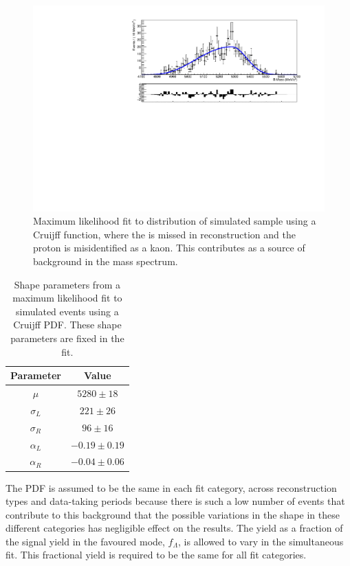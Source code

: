 \begin{figure}[h]
\centering
\includegraphics[width=0.7\linewidth]{figures/backgrounds/Lb2LcKst.pdf}
\caption{Maximum likelihood fit to distribution of simulated  sample using a Cruijff function, where the \pip is missed in reconstruction and the proton is misidentified as a kaon. This contributes as a source of background in the \kk mass spectrum.}
\label{Lbfit}
\end{figure}

\begin{table}[h]
\centering
\begin{tabular}{cc}
\hline
Parameter & Value \\
\hline
$\mu$ & $5280 \pm 18$ \\
$\sigma_L$ & $221 \pm 26$ \\
$\sigma_R$ & $96 \pm 16$ \\
$\alpha_L$ & $-0.19 \pm 0.19$ \\
$\alpha_R$ & $-0.04 \pm 0.06$ \\
\hline
\end{tabular}
\caption{Shape parameters from a maximum likelihood fit to simulated \decay{\Lb}{\Lc\Km} events using a Cruijff PDF. These shape parameters are fixed in the \CP fit.}
\label{fitresultsLb}
\end{table}

The PDF is assumed to be the same in each \kk fit category, across \KS reconstruction types and data-taking periods because there is such a low number of events that contribute to this background that the possible variations in the shape in these different categories has negligible effect on the results. The  yield as a fraction of the signal yield in the favoured \kpi mode, $f_{\Lambda}$, is allowed to vary in the simultaneous fit. This fractional yield is required to be the same for all fit categories.

